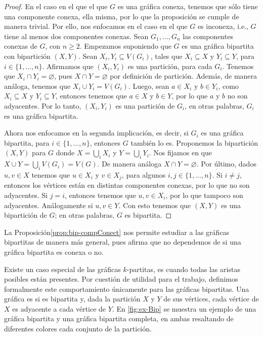 \begin{proof}
    En el caso en el que el que $G$ es una gr\'afica conexa, tenemos que s\'olo
    tiene una componente conexa, ella misma, por lo que la proposici\'on se
    cumple de manera trivial. Por ello, nos enfocamos en el caso en el que $G$
    es inconexa, i.e., $G$ tiene al menos dos componentes conexas. Sean $G_1,
    \dots, G_n$ las componentes conexas de $G$, con $n \geq 2$. Empezamos
    suponiendo que $G$ es una gr\'afica bipartita con bipartici\'on $(X,Y)$.
    Sean $X_i, Y_i\subseteq V(G_i)$, tales que $X_i \subseteq X$ y $Y_i
    \subseteq Y$, para $i \in \{1, \dots, n\}$. Afirmamos que $(X_i,Y_i)$ es una
    partici\'on, para cada $G_i$. Tenemos que $X_i \cap Y_i = \varnothing$, pues
    $X \cap Y = \varnothing$ por definici\'on de partici\'on. Adem\'as, de
    manera an\'aloga, tenemos que $X_i \cup Y_i = V(G_i)$.  Luego, sean $a \in
    X_i$ y $b \in Y_i$, como $X_i \subseteq X$ y $Y_i \subseteq Y$, entonces
    tenemos que $a \in X$ y $b \in Y$, por lo que $a$ y $b$ no son adyacentes.
    Por lo tanto, $(X_i, Y_i)$ es una partici\'on de $G_i$, en otras palabras,
    $G_i$ es una gr\'afica bipartita.

    Ahora nos enfocamos en la segunda implicaci\'on, es decir, si $G_i$ es una
    gr\'afica bipartita, para $i \in \{1, \dots, n\}$, entonces $G$ tambi\'en lo
    es. Proponemos la bipartici\'on $(X,Y)$ para $G$ donde $X =
    \bigcup\limits_{i} X_i$ y $Y =\bigcup\limits_{i}  Y_i$. Nos fijamos en que $X \cup
    Y = \bigcup \limits_{i}  V(G_i)=V(G)$. De manera an\'aloga $X \cap Y =
    \varnothing$. Por \'ultimo, dados $u,v \in X$ tenemos que $u \in X_i$ y $v
    \in X_j$, para algunos $i,j \in \{1, \dots,n\}$. Si $i \neq j$, entonces los
    v\'ertices est\'an en distintas componentes conexas, por lo que no son
    adyacentes. Si $j=i$, entonces tenemos que $u,v \in X_i$, por lo que tampoco
    son adyacentes. An\'alogamente si $u,v \in Y$. Con esto tenemos que $(X,Y)$
    es una bipartici\'on de $G$; en otras palabras, $G$ es bipartita.
\end{proof}

La Proposici\'on\ref{prop:bip-compConect} nos permite estudiar a las gr\'aficas
bipartitas de manera m\'as general, pues afirma que no dependemos de si una
gr\'afica bipartita es conexa o no.


Existe un caso especial de las gr\'aficas
$k$-partitas, es cuando todas las aristas posibles est\'an presentes. Por
cuesti\'on de utilidad para el trabajo, definimos formalmente este
comportamiento \'unicamente para las gr\'aficas bipartitas. Una gr\'afica es
 si es
bipartita y, dada la partici\'on $X$ y $Y$ de sus v\'ertices, cada v\'ertice de
$X$ es adyacente a cada v\'ertice de $Y$. En \cref{fig:ex-Bip} se muestra un
ejemplo de una gr\'afica bipartita y una gr\'afica bipartita completa, en ambas
resaltando de diferentes colores cada conjunto de la partici\'on. 

